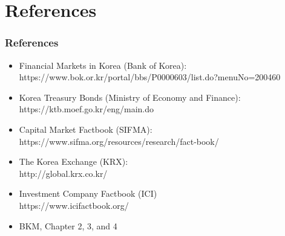 \documentclass[10pt]{beamer}
\begin{document}
	\section{References}
	\begin{frame}
		\frametitle{References}
		
		\begin{itemize} \itemsep10pt
			\item Financial Markets in Korea (Bank of Korea): \\ https://www.bok.or.kr/portal/bbs/P0000603/list.do?menuNo=200460
			
			\item Korea Treasury Bonds (Ministry of Economy and Finance):\\
			https://ktb.moef.go.kr/eng/main.do
			
			\item Capital Market Factbook (SIFMA): \\ https://www.sifma.org/resources/research/fact-book/
			
			\item The Korea Exchange (KRX): \\
			http://global.krx.co.kr/
			
			\item Investment Company Factbook (ICI) \\
			https://www.icifactbook.org/
			
			\item BKM, Chapter 2, 3, and 4
			
		\end{itemize}
		
	\end{frame}
	
	
\end{document}

